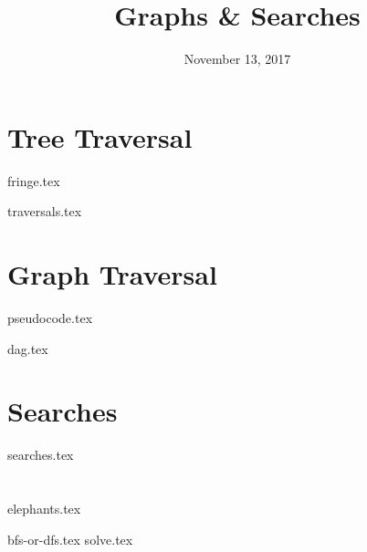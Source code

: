 \documentclass[11pt]{exam}
\title{Graphs \& Searches}
\date{November 13, 2017}
\begin{document}
\maketitle

\section{Tree Traversal}
{fringe.tex}
\begin{questions}
{traversals.tex}
\end{questions}

\section{Graph Traversal}
{pseudocode.tex}
\begin{questions}
{dag.tex}
\end{questions}

\clearpage

\section{Searches}
\begin{questions}
{searches.tex}
\end{questions}

\section{}
{elephants.tex}
\begin{questions}
{bfs-or-dfs.tex}
{solve.tex}
\end{questions}
\end{document}
